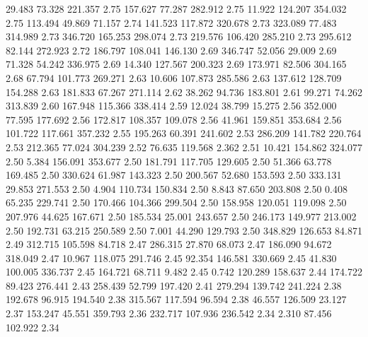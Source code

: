   29.483   73.328  221.357         2.75
 157.627   77.287  282.912         2.75
  11.922  124.207  354.032         2.75
 113.494   49.869   71.157         2.74
 141.523  117.872  320.678         2.73
 323.089   77.483  314.989         2.73
 346.720  165.253  298.074         2.73
 219.576  106.420  285.210         2.73
 295.612   82.144  272.923         2.72
 186.797  108.041  146.130         2.69
 346.747   52.056   29.009         2.69
  71.328   54.242  336.975         2.69
  14.340  127.567  200.323         2.69
 173.971   82.506  304.165         2.68
  67.794  101.773  269.271         2.63
  10.606  107.873  285.586         2.63
 137.612  128.709  154.288         2.63
 181.833   67.267  271.114         2.62
  38.262   94.736  183.801         2.61
  99.271   74.262  313.839         2.60
 167.948  115.366  338.414         2.59
  12.024   38.799   15.275         2.56
 352.000   77.595  177.692         2.56
 172.817  108.357  109.078         2.56
  41.961  159.851  353.684         2.56
 101.722  117.661  357.232         2.55
 195.263   60.391  241.602         2.53
 286.209  141.782  220.764         2.53
 212.365   77.024  304.239         2.52
  76.635  119.568    2.362         2.51
  10.421  154.862  324.077         2.50
   5.384  156.091  353.677         2.50
 181.791  117.705  129.605         2.50
  51.366   63.778  169.485         2.50
 330.624   61.987  143.323         2.50
 200.567   52.680  153.593         2.50
 333.131   29.853  271.553         2.50
   4.904  110.734  150.834         2.50
   8.843   87.650  203.808         2.50
   0.408   65.235  229.741         2.50
 170.466  104.366  299.504         2.50
 158.958  120.051  119.098         2.50
 207.976   44.625  167.671         2.50
 185.534   25.001  243.657         2.50
 246.173  149.977  213.002         2.50
 192.731   63.215  250.589         2.50
   7.001   44.290  129.793         2.50
 348.829  126.653   84.871         2.49
 312.715  105.598   84.718         2.47
 286.315   27.870   68.073         2.47
 186.090   94.672  318.049         2.47
  10.967  118.075  291.746         2.45
  92.354  146.581  330.669         2.45
  41.830  100.005  336.737         2.45
 164.721   68.711    9.482         2.45
   0.742  120.289  158.637         2.44
 174.722   89.423  276.441         2.43
 258.439   52.799  197.420         2.41
 279.294  139.742  241.224         2.38
 192.678   96.915  194.540         2.38
 315.567  117.594   96.594         2.38
  46.557  126.509   23.127         2.37
 153.247   45.551  359.793         2.36
 232.717  107.936  236.542         2.34
   2.310   87.456  102.922         2.34
